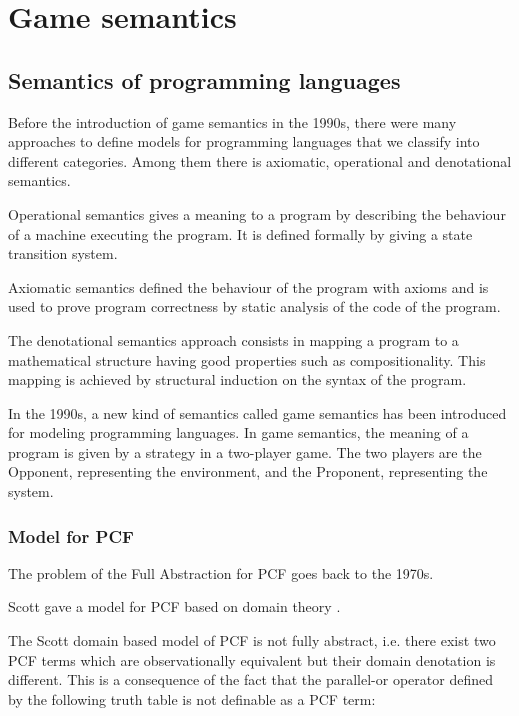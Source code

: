 \chapter{Game semantics}
\section{Semantics of programming languages}

Before the introduction of game semantics in the 1990s, there were
many approaches to define models for programming languages that we classify into different categories.
Among them there is axiomatic, operational and denotational semantics.

Operational semantics gives a meaning to a program by describing the
behaviour of a machine executing the program. It is defined formally by giving
a state transition system.

Axiomatic semantics defined the behaviour of the program
with axioms and is used to prove program correctness by static analysis of
the code of the program.

The denotational semantics approach consists in mapping a program to a mathematical structure
having good properties such as compositionality. This mapping is achieved by structural induction
on the syntax of the program.

In the 1990s, a new kind of semantics called game semantics has been
introduced for modeling programming languages. In game semantics,
the meaning of a program is given by a strategy in a two-player
game. The two players are the Opponent, representing the
environment, and the Proponent, representing the system.


\subsection{Model for PCF}


The problem of the Full Abstraction for PCF goes back to the 1970s.

Scott gave a model for PCF based on domain theory \citep{scott93}.

The Scott domain based model of PCF is not fully abstract, i.e.
there exist two PCF terms which are observationally equivalent but
their domain denotation is different. This is a consequence of the
fact that the parallel-or operator defined by the following truth
table is not definable as a PCF term:

